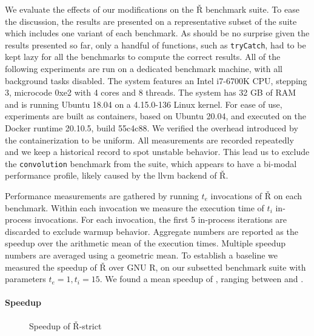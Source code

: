 \documentclass[review,nonacm,screen,acmsmall,anonymous=true]{acmart}
\renewcommand{\Rsh}{{\sf\v R}\xspace}
\newcommand{\Rshstrict}{{\sf\v R-strict}\xspace}
\begin{document}
We evaluate the effects of our modifications on the \Rsh benchmark suite.
To ease the discussion, the results are presented on a representative subset of
the suite which includes one variant of
each benchmark. As should be no surprise given the results presented so far,
only a handful of functions, such as
\lstinline{tryCatch}, had to be kept lazy for all the benchmarks to compute
the correct results.
All of the following experiments are run on a dedicated benchmark machine, with
all background tasks disabled. The system features an Intel i7-6700K CPU, stepping 3,
microcode 0xe2 with 4 cores and 8 threads. The system has 32 GB of RAM and is
running Ubuntu 18.04 on a 4.15.0-136 Linux kernel. For ease of use, experiments
are built as containers, based on Ubuntu 20.04, and executed on
the Docker runtime 20.10.5, build 55c4c88. We verified the overhead introduced by
the containerization to be uniform. All measurements are recorded repeatedly and we
keep a historical record to spot unstable behavior. This lead us to exclude the
\lstinline{convolution} benchmark from the suite, which appears to have a
bi-modal performance profile, likely caused by the llvm backend of \Rsh.

Performance measurements are gathered by running $t_e$ invocations of \Rsh on
each benchmark. Within each invocation we measure the execution time of $t_i$
in-process invocations. For each invocation, the first 5 in-process iterations
are discarded to exclude warmup behavior. Aggregate numbers are reported as the
speedup over the arithmetic mean of the execution times. Multiple speedup
numbers are averaged using a geometric mean. To establish a baseline we measured
the speedup of \Rsh over GNU R, on our subsetted benchmark suite with parameters
$t_e = 1, t_i = 15$. We found a mean speedup of \speedupRsh, ranging between
\speedupRshMin and \speedupRshMax.

\paragraph{Speedup}

\begin{figure}[h]
  \centering
  
  \caption{Speedup of \Rshstrict}
  \label{fig:speedup}
\end{figure}
\end{document}
